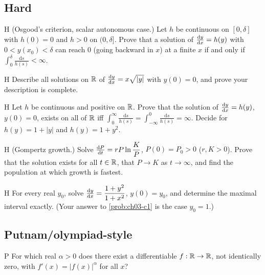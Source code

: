 \subsection*{Hard}

\begin{problem}{H}\label{prob:ch03-h1}
(Osgood's criterion, scalar autonomous case.) Let $h$ be continuous on
$[0,\delta]$ with $h(0) = 0$ and $h>0$ on $(0,\delta]$. Prove that a solution of
$\frac{\mathrm{d}y}{\mathrm{d}x} = h(y)$ with $0<y(x_0)<\delta$ can reach $0$ (going backward in
$x$) at a finite $x$ if and only if $\displaystyle\int_0^\delta\frac{\mathrm{d}s}{h(s)}<\infty$.
\end{problem}

\begin{problem}{H}\label{prob:ch03-h2}
Describe all solutions on $\mathbb{R}$ of $\frac{\mathrm{d}y}{\mathrm{d}x} = x\sqrt{|y|}$ with $y(0) = 0$,
and prove your description is complete.
\end{problem}

\begin{problem}{H}\label{prob:ch03-h3}
Let $h$ be continuous and positive on $\mathbb{R}$. Prove that the solution of
$\frac{\mathrm{d}y}{\mathrm{d}x} = h(y)$, $y(0) = 0$, exists on all of $\mathbb{R}$ iff
$\int_0^\infty\frac{\mathrm{d}s}{h(s)} = \int_{-\infty}^0\frac{\mathrm{d}s}{h(s)} = \infty$.
Decide for $h(y) = 1 + |y|$ and $h(y) = 1 + y^2$.
\end{problem}

\begin{problem}{H}\label{prob:ch03-h4}
(Gompertz growth.) Solve $\frac{\mathrm{d}P}{\mathrm{d}t} = rP\ln\dfrac{K}{P}$, $P(0) = P_0>0$
($r, K>0$). Prove that the solution exists for all $t\in\mathbb{R}$, that $P\to K$ as
$t\to\infty$, and find the population at which growth is fastest.
\end{problem}

\begin{problem}{H}\label{prob:ch03-h5}
For every real $y_0$, solve $\frac{\mathrm{d}y}{\mathrm{d}x} = \dfrac{1 + y^2}{1 + x^2}$, $y(0) = y_0$,
and determine the maximal interval exactly. (Your answer to \cref{prob:ch03-c1}
is the case $y_0 = 1$.)
\end{problem}

\subsection*{Putnam/olympiad-style}

\begin{problem}{P}\label{prob:ch03-p1}
For which real $\alpha>0$ does there exist a differentiable $f:\mathbb{R}\to\mathbb{R}$, not
identically zero, with $f'(x) = |f(x)|^{\alpha}$ for all $x$?
\end{problem}

